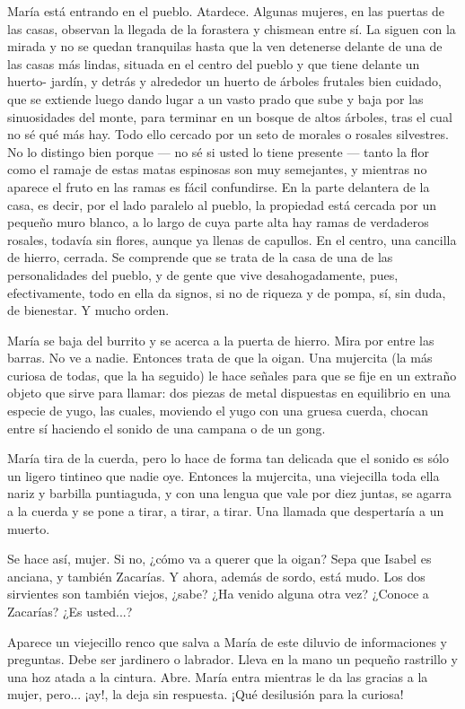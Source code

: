 \documentclass[12pt]{book} %
\begin{document}
María está entrando en el pueblo. Atardece. Algunas mujeres, en las puertas de las casas, observan la llegada de la forastera y chismean entre sí. La siguen con la mirada y no se quedan tranquilas hasta que la ven detenerse delante de una de las casas más lindas, situada en el centro del pueblo y que tiene delante un huerto- jardín, y detrás y alrededor un huerto de árboles frutales bien cuidado, que se extiende luego dando lugar a un vasto prado que sube y baja por las sinuosidades del monte, para terminar en un bosque de altos árboles, tras el cual no sé qué más hay. Todo ello cercado por un seto de morales o rosales silvestres. No lo distingo bien porque — no sé si usted lo tiene presente — tanto la flor como el ramaje de estas matas espinosas son muy semejantes, y mientras no aparece el fruto en las ramas es fácil confundirse. En la parte delantera de la casa, es decir, por el lado paralelo al pueblo, la propiedad está cercada por un pequeño muro blanco, a lo largo de cuya parte alta hay ramas de verdaderos rosales, todavía sin flores, aunque ya llenas de capullos. En el centro, una cancilla de hierro, cerrada. Se comprende que se trata de la casa de una de las personalidades del pueblo, y de gente que vive desahogadamente, pues, efectivamente, todo en ella da signos, si no de riqueza y de pompa, sí, sin duda, de bienestar. Y mucho orden. 

María se baja del burrito y se acerca a la puerta de hierro. Mira por entre las barras. No ve a nadie. Entonces trata de que la oigan. Una mujercita (la más curiosa de todas, que la ha seguido) le hace señales para que se fije en un extraño objeto que sirve para llamar: dos piezas de metal dispuestas en equilibrio en una especie de yugo, las cuales, moviendo el yugo con una gruesa cuerda, chocan entre sí haciendo el sonido de una campana o de un gong. 

María tira de la cuerda, pero lo hace de forma tan delicada que el sonido es sólo un ligero tintineo que nadie oye. Entonces la mujercita, una viejecilla toda ella nariz y barbilla puntiaguda, y con una lengua que vale por diez juntas, se agarra a la cuerda y se pone a tirar, a tirar, a tirar. Una llamada que despertaría a un muerto. 

Se hace así, mujer. Si no, ¿cómo va a querer que la oigan? Sepa que Isabel es anciana, y también Zacarías. Y ahora, además de sordo, está mudo. Los dos sirvientes son también viejos, ¿sabe? ¿Ha venido alguna otra vez? ¿Conoce a Zacarías? ¿Es usted...? 

Aparece un viejecillo renco que salva a María de este diluvio de informaciones y preguntas. Debe ser jardinero o labrador. Lleva en la mano un pequeño rastrillo y una hoz atada a la cintura. Abre. María entra mientras le da las gracias a la mujer, pero... ¡ay!, la deja sin respuesta. ¡Qué desilusión para la curiosa! 
\end{document}
